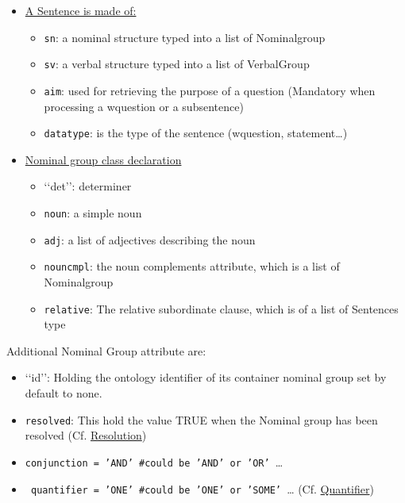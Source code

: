 \documentclass[twoside,a4paper,10pt]{report}
\begin{document}
\begin{itemize}
    \item  \underline{A Sentence is made of:}
\begin{itemize}
    \item  \texttt{sn}: a nominal structure typed into a list of Nominal{\textunderscore}group
    \item  \texttt{sv}: a verbal structure typed into a list of Verbal{\textunderscore}Group
    \item  \texttt{aim}: used for retrieving the purpose of a question (Mandatory when processing a w{\textunderscore}question or a subsentence)
    \item  \texttt{data{\textunderscore}type}: is the type of the sentence (w{\textunderscore}question, statement\ldots{})
\end{itemize}

\end{itemize}

\begin{itemize}
    \item  \underline{Nominal group class declaration}
\begin{itemize}
    \item  ‘‘det’’: determiner
    \item  \texttt{noun}: a simple noun
    \item  \texttt{adj}: a list of adjectives describing the noun
    \item  \texttt{noun{\textunderscore}cmpl}: the noun complements attribute, which is a list of Nominal{\textunderscore}group
    \item  \texttt{relative}: The relative subordinate clause, which is of a list of Sentences type
\end{itemize}

\end{itemize}

Additional Nominal Group attribute are:


\begin{itemize}
    \item  ‘‘id’’: Holding the ontology identifier of its container nominal group set by default to none.
    \item  \texttt{{\textunderscore}resolved}: This hold the value TRUE when the Nominal group has been resolved (Cf. \hyperref[b7e164b34ff76b1cda93a058604190da]{Resolution})
    \item  \texttt{{\textunderscore}conjunction = 'AND' \#could be 'AND' or 'OR' }\ldots{} 
    \item  \texttt{ {\textunderscore}quantifier = 'ONE' \#could be 'ONE' or 'SOME' }\ldots{} (Cf. \hyperref[c9a5eb8d391a77a428b429e98ad45e2c]{Quantifier})
\end{itemize}
\end{document}
